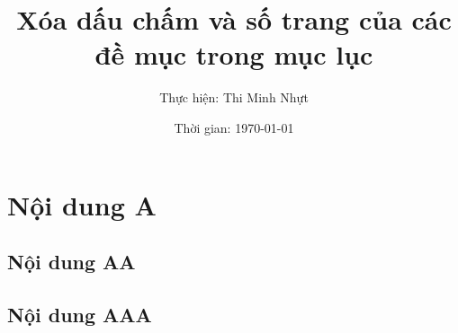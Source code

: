 \documentclass[10pt,a4paper]{article}
\title{Xóa dấu chấm và số trang của các đề mục trong mục lục}
\author{Thực hiện: Thi Minh Nhựt}
\author{Thời gian: \today}
\begin{document}
\maketitle

\tableofcontents
\newpage


\section{Nội dung A}
\subsection{Nội dung AA}
\subsection{Nội dung AAA}
\end{document}
